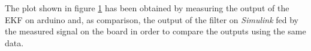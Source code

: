 \begin{figure}[!tbh]
  \centering
  \hfill
  \caption{}
    \label{fig:ekfsimard}
\end{figure}

The plot shown in figure \ref{fig:ekfsimard} has been obtained by measuring the output of the EKF on arduino and, as comparison, the output of the filter on \emph{Simulink} fed by the measured signal on the board in order to compare the outputs using the same data.
\\